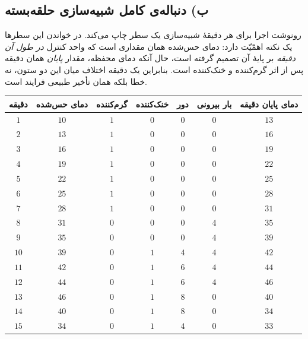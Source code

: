 \documentclass[12pt,a4paper]{article}
\begin{document}
	\subsection*{ب) دنباله‌ی کامل شبیه‌سازی حلقه‌بسته}
	رونوشت اجرا برای هر دقیقهٔ شبیه‌سازی یک سطر چاپ می‌کند. در خواندن این سطرها یک نکته اهمّیّت دارد: دمای حس‌شده همان مقداری است که واحد کنترل \emph{در طول آن دقیقه} بر پایهٔ آن تصمیم گرفته است، حال آنکه دمای محفظه، مقدار \emph{پایان} همان دقیقه پس از اثر گرم‌کننده و خنک‌کننده است. بنابراین یک دقیقه اختلاف میان این دو ستون، نه خطا بلکه همان تأخیر طبیعی فرایند است.

	\begin{table}[H]
		\centering
		\footnotesize
		\begin{tabular}{|c|c|c|c|c|c|c|}
			\hline
			\textbf{دقیقه} & \textbf{دمای حس‌شده} & \textbf{گرم‌کننده} & \textbf{خنک‌کننده} & \textbf{دور} & \textbf{بار بیرونی} & \textbf{دمای پایان دقیقه} \\ \hline
			\(1\)  & \(10\)  & \(1\) & \(0\) & \(0\) & \(0\) & \(13\) \\ \hline
			\(2\)  & \(13\)  & \(1\) & \(0\) & \(0\) & \(0\) & \(16\) \\ \hline
			\(3\)  & \(16\)  & \(1\) & \(0\) & \(0\) & \(0\) & \(19\) \\ \hline
			\(4\)  & \(19\)  & \(1\) & \(0\) & \(0\) & \(0\) & \(22\) \\ \hline
			\(5\)  & \(22\)  & \(1\) & \(0\) & \(0\) & \(0\) & \(25\) \\ \hline
			\(6\)  & \(25\)  & \(1\) & \(0\) & \(0\) & \(0\) & \(28\) \\ \hline
			\(7\)  & \(28\)  & \(1\) & \(0\) & \(0\) & \(0\) & \(31\) \\ \hline
			\(8\)  & \(31\)  & \(0\) & \(0\) & \(0\) & \(4\) & \(35\) \\ \hline
			\(9\)  & \(35\)  & \(0\) & \(0\) & \(0\) & \(4\) & \(39\) \\ \hline
			\(10\) & \(39\)  & \(0\) & \(1\) & \(4\) & \(4\) & \(42\) \\ \hline
			\(11\) & \(42\)  & \(0\) & \(1\) & \(6\) & \(4\) & \(44\) \\ \hline
			\(12\) & \(44\)  & \(0\) & \(1\) & \(6\) & \(4\) & \(46\) \\ \hline
			\(13\) & \(46\)  & \(0\) & \(1\) & \(8\) & \(0\) & \(40\) \\ \hline
			\(14\) & \(40\)  & \(0\) & \(1\) & \(8\) & \(0\) & \(34\) \\ \hline
			\(15\) & \(34\)  & \(0\) & \(1\) & \(4\) & \(0\) & \(33\) \\ \hline

\end{tabular}
\end{table}
\end{document}
